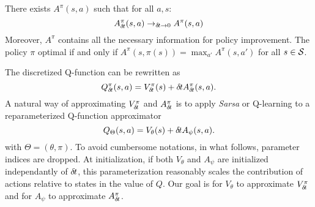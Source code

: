 
  \begin{theorem}
    There exists $A^\pi(s, a)$ such that for all $a, s$:
    \begin{equation}
      A^\pi_{\delta\hspace{-.1em}t}(s, a) \rightarrow_{{\delta\hspace{-.1em}t} \rightarrow 0} A^\pi(s, a)
    \end{equation}
    Moreover, $A^\pi$ contains all the necessary information for policy improvement. The policy $\pi$ optimal if and only if $A^\pi(s, \pi(s)) = \max_{a'}A^\pi(s, a')$ for all $s \in {\cal S}$.
  \end{theorem}

The discretized Q-function can be rewritten as
\begin{equation}
	Q^\pi_{\delta\hspace{-.1em}t}(s, a) = V^\pi_{\delta\hspace{-.1em}t}(s) + {\delta\hspace{-.1em}t} A^\pi_{\delta\hspace{-.1em}t}(s, a).
	\label{eq:reparam_q_pi}
\end{equation}
A natural way of approximating $V^\pi_{\delta\hspace{-.1em}t}$ and $A^\pi_{\delta\hspace{-.1em}t}$ is to apply
\emph{Sarsa} or Q-learning to a reparameterized Q-function approximator
\begin{equation}
	Q_\Theta(s, a) = V_{\theta}(s) + {\delta\hspace{-.1em}t} A_{\psi}(s, a).
\end{equation}
with $\Theta = (\theta, \pi)$. To avoid cumbersome notations, in what follows,
parameter indices are dropped.  At initialization, if both $V_{\theta}$ and
$A_{\psi}$ are initialized independantly of ${\delta\hspace{-.1em}t}$, this parameterization
reasonably scales the contribution of actions relative to states in the value
of $Q$.  Our goal is for $V_\theta$ to approximate $V^\pi_{\delta\hspace{-.1em}t}$ and for
$A_{\psi}$ to approximate $A^\pi_{\delta\hspace{-.1em}t}$.


